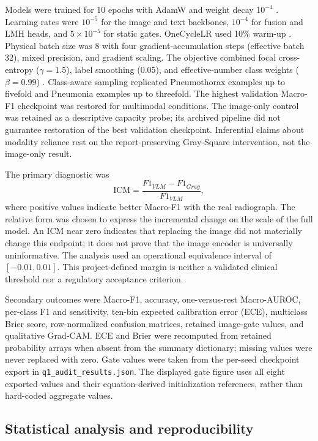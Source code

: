 \documentclass[a4paper,fleqn]{cas-sc}
\begin{document}
Models were trained for 10 epochs with AdamW and weight decay $10^{-4}$
\cite{loshchilov2019adamw}. Learning rates were $10^{-5}$ for the image and text
backbones, $10^{-4}$ for fusion and LMH heads, and $5\times10^{-5}$ for static
gates. OneCycleLR used 10\% warm-up \cite{smith2019superconvergence}. Physical
batch size was 8 with four gradient-accumulation steps (effective batch 32),
mixed precision, and gradient scaling. The objective combined focal
cross-entropy ($\gamma=1.5$), label smoothing (0.05), and effective-number class
weights ($\beta=0.99$) \cite{lin2017focalloss}. Class-aware sampling replicated
Pneumothorax examples up to fivefold and Pneumonia examples up to threefold.
The highest validation Macro-F1 checkpoint was restored for multimodal
conditions. The image-only control was retained as a descriptive capacity
probe; its archived pipeline did not guarantee restoration of the best
validation checkpoint. Inferential claims about modality reliance rest on the
report-preserving Gray-Square intervention, not the image-only result.

The primary diagnostic was
\begin{equation}
\mathrm{ICM}=\frac{F1_{VLM}-F1_{Gray}}{F1_{VLM}},
\end{equation}
where positive values indicate better Macro-F1 with the real radiograph. The
relative form was chosen to express the incremental change on the scale of the
full model. An ICM near zero indicates that replacing the image did not
materially change this endpoint; it does not prove that the image encoder is
universally uninformative. The analysis used an operational equivalence interval
of $[-0.01,0.01]$. This project-defined margin is neither a validated clinical
threshold nor a regulatory acceptance criterion.

Secondary outcomes were Macro-F1, accuracy, one-versus-rest Macro-AUROC,
per-class F1 and sensitivity, ten-bin expected calibration error (ECE),
multiclass Brier score, row-normalized confusion matrices, retained image-gate
values, and qualitative Grad-CAM. ECE and Brier were recomputed from retained
probability arrays when absent from the summary dictionary; missing values were
never replaced with zero. Gate values were taken from the per-seed checkpoint
export in \texttt{q1\_audit\_results.json}. The displayed gate figure uses all
eight exported values and their equation-derived initialization references,
rather than hard-coded aggregate values.

\subsection{Statistical analysis and reproducibility}\label{sec:statistics}
\end{document}
